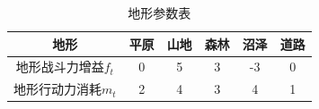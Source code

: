 \documentclass[a4paper,4pt]{article}
\begin{document}
\begin{table}[htbp]
  \centering
  \caption{地形参数表}
  \begin{tabular}{c|c|c|c|c|c}
    \hline
    地形                & 平原 & 山地 & 森林 & 沼泽 & 道路 \bigstrut \\
    \hline
    地形战斗力增益$f_t$ & 0    & 5    & 3    & -3   & 0 \bigstrut    \\
    \hline
    地形行动力消耗$m_t$ & 2    & 4    & 3    & 4    & 1 \bigstrut    \\
    \hline
  \end{tabular}%
  \label{地形}%
\end{table}%
\end{document}
